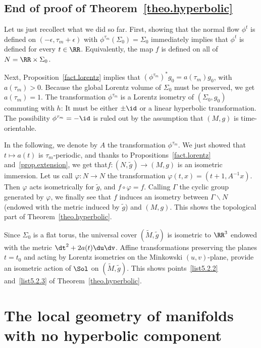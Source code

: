 \subsection{End of proof of Theorem~\ref{theo.hyperbolic}}\label{sec.conclusionhyperbolic}
Let us just recollect what we did so far. First, showing that the normal flow $\phi^t$ is defined on $(-\epsilon,\tau_m+\epsilon)$ with $\phi^{\tau_m}(\Sigma_0)=\Sigma_0$ immediately implies that $\phi^t$ is defined for every $t \in \RR$. Equivalently, the map $f$ is defined on all of $N=\RR \times \Sigma_0$.

Next, Proposition~\ref{fact.lorentz} implies that $(\phi^{\tau_m})^*g_0=a(\tau_m)g_0$, with $a(\tau_m)>0$. Because the global Lorentz volume of $\Sigma_0$ must be preserved, we get $a(\tau_m)=1$. The transformation $\phi^{\tau_m}$ is a Lorentz isometry of $(\Sigma_0,g_0)$ commuting with $h$: It must be either $\pm \id$ or a linear hyperbolic transformation. The possibility $\phi^{\tau_m}=- \id$ is ruled out by the assumption that $(M,g)$ is time-orientable.

In the following, we denote by $A$ the transformation $\phi^{\tau_m}$. We just showed that $t \mapsto a(t)$ is $\tau_m$-periodic, and thanks to Propositions~\ref{fact.lorentz} and~\ref{prop.extension}, we get that\linebreak $f: (N,\tilde{g}) \to (M,g)$ is an isometric immersion. Let us call $\varphi : N \to N$ the transformation $\varphi(t,x)=(t+1,A^{-1}x)$. Then $\varphi$ acts isometrically for $\tilde{g}$, and $f \circ \varphi = f$. Calling $\Gamma$ the cyclic group generated by $\varphi$, we finally see that $f$ induces an isometry between $\Gamma \backslash N$ (endowed with the metric induced by ${\tilde g}$) and $(M,g)$. This shows the topological part of Theorem~\ref{theo.hyperbolic}.

Since $\Sigma_0$ is a flat torus, the universal cover $(\tilde{M},\tilde{g})$ is isometric to $\RR^3$ endowed with the metric $\dt^2+2a(t)\du\dv$. Affine transformations preserving the planes $t=t_0$ and acting by Lorentz isometries on the Minkowski $(u,v)$-plane, provide an isometric action of $\Sol$ on $(\tilde{M},\tilde{g})$. This shows points~\eqref{list5.2.2} and~\eqref{list5.2.3} of Theorem~\ref{theo.hyperbolic}.



\section{The local geometry of manifolds with no hyperbolic component}\label{sec.local.geometry}

